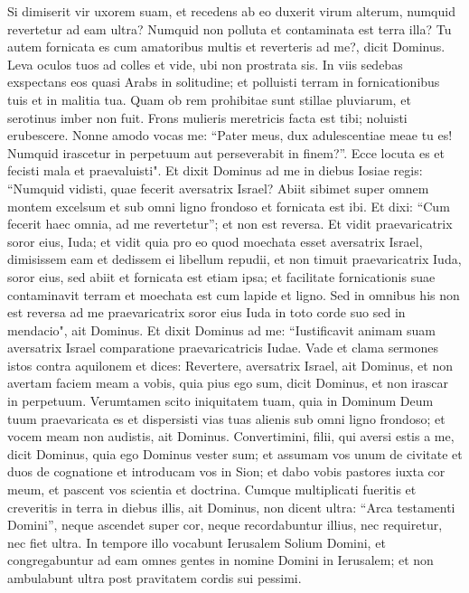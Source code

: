 \begin{biblechapter}  
\verse Si dimiserit vir uxorem suam, et recedens ab eo duxerit virum alterum, numquid revertetur ad eam ultra? Numquid non polluta et contaminata est terra illa? Tu autem fornicata es cum amatoribus multis et reverteris ad me?, dicit Dominus. 
\verse Leva oculos tuos ad colles et vide, ubi non prostrata sis. In viis sedebas exspectans eos quasi Arabs in solitudine; et polluisti terram in fornicationibus tuis et in malitia tua. 
\verse Quam ob rem prohibitae sunt stillae pluviarum, et serotinus imber non fuit. Frons mulieris meretricis facta est tibi; noluisti erubescere. 
\verse Nonne amodo vocas me: “Pater meus, dux adulescentiae meae tu es! 
\verse Numquid irascetur in perpetuum aut perseverabit in finem?”. Ecce locuta es et fecisti mala et praevaluisti". 
\verse Et dixit Dominus ad me in diebus Iosiae regis: “Numquid vidisti, quae fecerit aversatrix Israel? Abiit sibimet super omnem montem excelsum et sub omni ligno frondoso et fornicata est ibi. 
\verse Et dixi: “Cum fecerit haec omnia, ad me revertetur”; et non est reversa. Et vidit praevaricatrix soror eius, Iuda; 
\verse et vidit quia pro eo quod moechata esset aversatrix Israel, dimisissem eam et dedissem ei libellum repudii, et non timuit praevaricatrix Iuda, soror eius, sed abiit et fornicata est etiam ipsa; 
\verse et facilitate fornicationis suae contaminavit terram et moechata est cum lapide et ligno. 
\verse Sed in omnibus his non est reversa ad me praevaricatrix soror eius Iuda in toto corde suo sed in mendacio", ait Dominus. 
\verse Et dixit Dominus ad me: “Iustificavit animam suam aversatrix Israel comparatione praevaricatricis Iudae. 
\verse Vade et clama sermones istos contra aquilonem et dices: Revertere, aversatrix Israel, ait Dominus, et non avertam faciem meam a vobis, quia pius ego sum, dicit Dominus, et non irascar in perpetuum. 
\verse Verumtamen scito iniquitatem tuam, quia in Dominum Deum tuum praevaricata es et dispersisti vias tuas alienis sub omni ligno frondoso; et vocem meam non audistis, ait Dominus. 
\verse Convertimini, filii, qui aversi estis a me, dicit Dominus, quia ego Dominus vester sum; et assumam vos unum de civitate et duos de cognatione et introducam vos in Sion; 
\verse et dabo vobis pastores iuxta cor meum, et pascent vos scientia et doctrina. 
\verse Cumque multiplicati fueritis et creveritis in terra in diebus illis, ait Dominus, non dicent ultra: “Arca testamenti Domini”, neque ascendet super cor, neque recordabuntur illius, nec requiretur, nec fiet ultra. 
\verse In tempore illo vocabunt Ierusalem Solium Domini, et congregabuntur ad eam omnes gentes in nomine Domini in Ierusalem; et non ambulabunt ultra post pravitatem cordis sui pessimi. 

\end{biblechapter}

